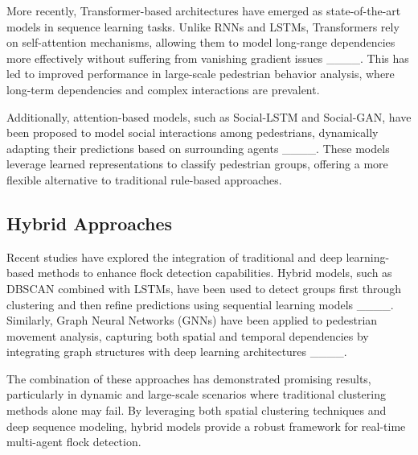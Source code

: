 More recently, Transformer-based architectures have emerged as state-of-the-art models in sequence learning tasks. Unlike RNNs and LSTMs, Transformers rely on self-attention mechanisms, allowing them to model long-range dependencies more effectively without suffering from vanishing gradient issues ____. This has led to improved performance in large-scale pedestrian behavior analysis, where long-term dependencies and complex interactions are prevalent.

Additionally, attention-based models, such as Social-LSTM and Social-GAN, have been proposed to model social interactions among pedestrians, dynamically adapting their predictions based on surrounding agents ____. These models leverage learned representations to classify pedestrian groups, offering a more flexible alternative to traditional rule-based approaches.

\subsection{Hybrid Approaches}

Recent studies have explored the integration of traditional and deep learning-based methods to enhance flock detection capabilities. Hybrid models, such as DBSCAN combined with LSTMs, have been used to detect groups first through clustering and then refine predictions using sequential learning models ____. Similarly, Graph Neural Networks (GNNs) have been applied to pedestrian movement analysis, capturing both spatial and temporal dependencies by integrating graph structures with deep learning architectures ____.

The combination of these approaches has demonstrated promising results, particularly in dynamic and large-scale scenarios where traditional clustering methods alone may fail. By leveraging both spatial clustering techniques and deep sequence modeling, hybrid models provide a robust framework for real-time multi-agent flock detection.